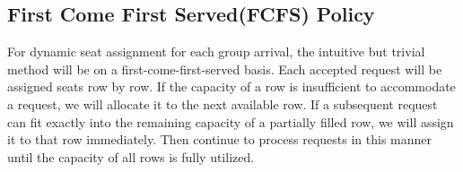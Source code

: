 







\subsection{First Come First Served(FCFS) Policy}\label{largest_pattern}
For dynamic seat assignment for each group arrival, the intuitive but trivial method will be on a first-come-first-served basis. Each accepted request will be assigned seats row by row. If the capacity of a row is insufficient to accommodate a request, we will allocate it to the next available row. If a subsequent request can fit exactly into the remaining capacity of a partially filled row, we will assign it to that row immediately. Then continue to process requests in this manner until the capacity of all rows is fully utilized.




